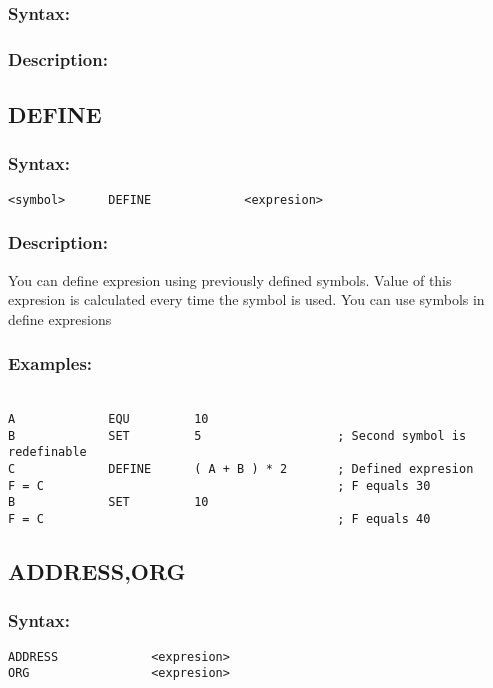 {        \subsubsection{Syntax:}

        \subsubsection{Description:}

    \subsection{DEFINE}
        \subsubsection{Syntax:}
            \verb'<symbol>      DEFINE             <expresion>'

        \subsubsection{Description:}
        You can define expresion using previously defined symbols. Value of this expresion is calculated every time the symbol is used. You can use symbols in define expresions

        \subsubsection{Examples:}
        {
            ~\\
            \usecodefont
            \verb'A             EQU         10'\\
            \verb'B             SET         5                   ; Second symbol is redefinable'\\
            \verb'C             DEFINE      ( A + B ) * 2       ; Defined expresion'\\
            \verb'F = C                                         ; F equals 30'\\
            \verb'B             SET         10'\\
            \verb'F = C                                         ; F equals 40'\\
        }

    \subsection{ADDRESS,ORG}
        \subsubsection{Syntax:}
            \verb'ADDRESS             <expresion>'\\
            \verb'ORG                 <expresion>'

}
